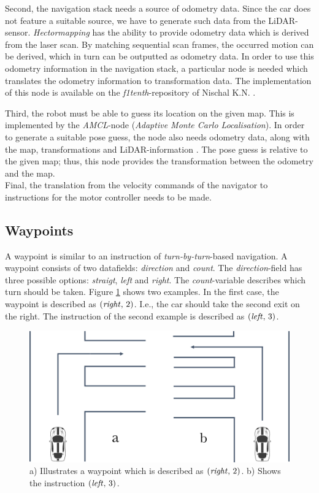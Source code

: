 \documentclass[conference,a4paper]{IEEEtran}
\begin{document}
Second, the navigation stack needs a source of odometry data. Since the car does not feature a suitable source, we have to generate such data from the LiDAR-sensor. \emph{Hector\textunderscore mapping} has the ability to provide odometry data which is derived from the laser scan. By matching sequential scan frames, the occurred motion can be derived, which in turn can be outputted as odometry data. In order to use this odometry information in the navigation stack, a particular node is needed which translates the odometry information to transformation data. The implementation of this node is available on the \emph{f1tenth}-repository of Nischal K.N. \cite{K.N.2016}.

Third, the robot must be able to guess its location on the given map. This is implemented by the \emph{AMCL}-node (\emph{Adaptive Monte Carlo Localisation}). In order to generate a suitable pose guess, the node also needs odometry data, along with the map, transformations and LiDAR-information \cite{Gerkey2016} \cite{Thrun1999}. The pose guess is relative to the given map; thus, this node provides the transformation between the odometry and the map.\\
Final, the translation from the velocity commands of the navigator to instructions for the motor controller needs to be made.

\subsection{Waypoints}
A waypoint is similar to an instruction of  \emph{turn-by-turn}-based navigation. A waypoint consists of two datafields: \emph{direction} and \emph{count}.
The \emph{direction}-field has three possible options: \emph{straigt}, \emph{left} and \emph{right}. The \emph{count}-variable describes which turn should be taken. Figure \ref{fig:waypoints_turns} shows two examples. In the first case, the waypoint is described as $(\text{\emph{right}},\,2)$. I.e., the car should take the second exit on the right. The instruction of the second example is described as $(\text{\emph{left}},\,3)$. 

\begin{figure}[!t]
	\includegraphics[width=\columnwidth]{waypoints_turns}
	\centering
	\caption{a) Illustrates a waypoint which is described as $(\text{\emph{right}},\,2)$. b) Shows the instruction $(\text{\emph{left}},\,3)$. }
	\label{fig:waypoints_turns}
\end{figure}
\end{document}

